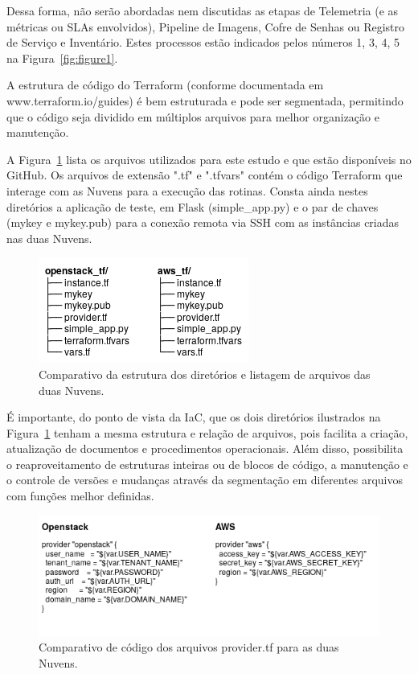 \documentclass[12pt]{article}
\begin{document}
	Dessa forma, não serão abordadas nem discutidas as etapas de Telemetria	(e as métricas ou SLAs envolvidos), Pipeline de Imagens, Cofre de Senhas ou Registro de Serviço e Inventário. Estes processos estão indicados pelos números 1, 3, 4, 5 na Figura~\ref{fig:figure1}.
	
	A estrutura de código do Terraform (conforme documentada em www.terraform.io/guides) é bem estruturada e pode ser segmentada, permitindo que o código seja dividido em múltiplos arquivos para melhor organização e manutenção. 
	
	A Figura~\ref{fig:figure3a} lista os arquivos utilizados para este estudo e que estão disponíveis no GitHub. Os arquivos de extensão ".tf" e ".tfvars" contém o código Terraform que interage com as Nuvens para a execução das rotinas. Consta ainda nestes diretórios a aplicação de teste, em Flask (simple\_app.py) e o par de chaves (mykey e mykey.pub) para a conexão remota via SSH com as instâncias criadas nas duas Nuvens.  
	
	\begin{figure}[H]
		\centering
		\includegraphics[width=0.42\linewidth]{figuras/Figure3a.png}
		\caption{Comparativo da estrutura dos diretórios e listagem de arquivos das duas Nuvens.}
		\label{fig:figure3a}
	\end{figure}
	
	É importante, do ponto de vista da IaC, que os dois diretórios ilustrados na Figura~\ref{fig:figure3a} tenham a mesma estrutura e relação de arquivos, pois facilita a criação, atualização de documentos e procedimentos operacionais. Além disso, possibilita o reaproveitamento de estruturas inteiras ou de blocos de código, a manutenção e o controle de versões e mudanças através da segmentação em diferentes arquivos com funções melhor definidas. 
		
	\begin{figure}[H]
		\centering
		\includegraphics[width=0.8\linewidth]{figuras/Figure3b.png}
		\caption{Comparativo de código dos arquivos provider.tf para as duas Nuvens.}
		\label{fig:figure3b}
	\end{figure}
	
\end{document}
